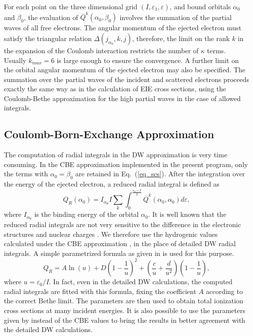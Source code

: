 \documentclass[preprint, floatfix, pra, showpacs, showkeys]{revtex4}
\begin{document}
For each point on the three dimensional grid $(I,\varepsilon_1, \varepsilon)$,
and bound orbitals $\alpha_0$ and $\beta_0$, the evaluation of
$\overline{Q}^k(\alpha_0,\beta_0)$ involves the summation of the 
partial waves of all free electrons. The angular momentum of the ejected
electron must satisfy the triangular relation $\Delta(j_{\alpha_0}, k, j)$,
therefore, the limit on the rank $k$ in the expansion of the Coulomb
interaction restricts the number of $\kappa$ terms. Usually $k_{max} = 6$ is
large enough to ensure the convergence. A further limit on the orbital angular
momentum of 
the ejected electron may also be specified. The summation over the partial
waves of the incident and scattered electrons proceeds exactly the same way as
in the calculation of EIE cross sections, using the Coulomb-Bethe
approximation for the high partial waves in the case of allowed integrals.

\subsection{Coulomb-Born-Exchange Approximation}
The computation of radial integrals in the DW approximation is very time
consuming. In the CBE approximation implemented in the present program, only
the terms with $\alpha_0 = \beta_0$ are retained in Eq.~(\ref{eq_scs}). After
the integration over the energy of the ejected electron, a reduced radial
integral is defined as 
\begin{equation}
\label{eq_reduced}
Q_R(\alpha_0) = I_{\alpha_0}I
\sum_k\int_0^{\frac{\varepsilon_0-I}{2}}
\overline{Q}^k(\alpha_0,\alpha_0)d\varepsilon,
\end{equation}
where $I_{\alpha_0}$ is the binding energy of the orbital $\alpha_0$. It is
well known that the reduced radial integrals are not very sensitive to the
difference in the electronic structures and nuclear charges \cite{zhang90}. We
therefore use the hydrogenic values calculated under the CBE approximation
\cite{golden77, golden80}, in the place of detailed DW radial integrals. A
simple parametrized formula as given in \textcite{zhang90} is used for this
purpose. 
\begin{equation}
Q_R = A\ln(u)+D\left(1-\frac{1}{u}\right)^2+
\left(\frac{c}{u}+\frac{d}{u^2}\right)\left(1-\frac{1}{u}\right),
\end{equation}
where $u=\varepsilon_0/I$. In fact, even in the detailed DW calculations, the
computed radial integrals are fitted with this formula, fixing the coefficient
$A$ according to the correct Bethe limit. The parameters are then used to
obtain total ionization cross sections at many incident energies. It is also
possible to use the parameters given by \textcite{fontes93} instead of the CBE
values to bring the results in better agreement with the detailed DW
calculations. 
\end{document}
